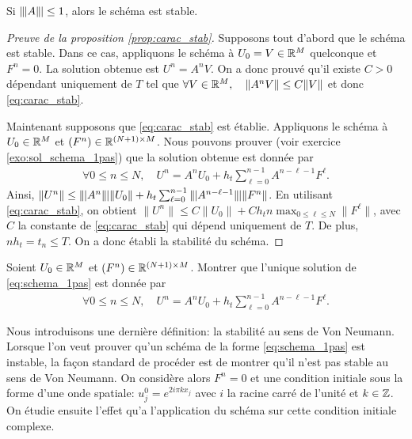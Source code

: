 \documentclass[12pt,a4paper,twoside]{article}
\begin{document}
\begin{corrolary}
  \label{corro:stability}
  Si $\|\!\;\!| A \|\!\;\!| \leq 1$, alors le sch\'ema est stable.
\end{corrolary}

\begin{proof}[Preuve de la proposition \ref{prop:carac_stab}]
  Supposons tout d'abord que le sch\'ema est stable.
  Dans ce cas, appliquons le sch\'ema \`a $U_0 = V \in \mathbb{R}^{M}$
  quelconque et $F^n = 0$. 
  La solution obtenue est $U^n = A^n V$.
  On a donc prouv\'e qu'il existe $C>0$ d\'ependant uniquement
  de $T$ tel que
  $\forall V \in \mathbb{R}^{M} , \quad \| A^n V \| \leq C \| V \|$
  et donc \eqref{eq:carac_stab}.

  Maintenant supposons que \eqref{eq:carac_stab} est \'etablie.
  Appliquons le sch\'ema \`a $U_0 \in \mathbb{R}^{M}$
  et $(F^n) \in \mathbb{R}^{(N+1) \times M}$.
  Nous pouvons prouver (voir exercice \ref{exo:sol_schema_1pas}) 
  que la solution obtenue est donn\'ee par
  \begin{align*}
    \forall 0 \leq n \leq N , \quad U^n = A^n U_0 + h_t \sum_{\ell = 0}^{n-1} A^{n-\ell-1} F^{\ell} .
  \end{align*}
  Ainsi, $\| U^n \| \leq \tn A^n \tn \| U_0 \| 
  + h_t \sum_{\ell = 0}^{n-1} \tn A^{n-\ell-1} \tn \| F^n \|$.
  En utilisant \eqref{eq:carac_stab}, on obtient
  $\| U^n \| \leq C \| U_0 \| + C h_t n \max_{0\leq \ell \leq N} \| F^{\ell} \|$,
  avec $C$ la constante de \eqref{eq:carac_stab} qui d\'epend
  uniquement de $T$.
  De plus, $n h_t = t_n \leq T$.
  On a donc \'etabli la stabilit\'e du sch\'ema.
\end{proof}


\begin{exercise}
  \label{exo:sol_schema_1pas}
  Soient $U_0 \in \mathbb{R}^{M}$ et $(F^n) \in \mathbb{R}^{(N+1) \times M}$.
  Montrer que l'unique solution de \eqref{eq:schema_1pas}
  est donn\'ee par
  \begin{align}
    \label{eq:sol_Un}
    \forall 0 \leq n \leq N , \quad  U^n = A^n U_0 + h_t \sum_{\ell = 0}^{n-1} A^{n-\ell-1} F^{\ell} .
  \end{align}
\end{exercise}


Nous introduisons une derni\`ere d\'efinition: la stabilit\'e
au sens de Von Neumann.
Lorsque l'on veut prouver qu'un sch\'ema de la forme \eqref{eq:schema_1pas}
est instable, la fa\c{c}on standard
de proc\'eder est de montrer qu'il n'est pas stable au sens de Von Neumann.
On consid\`ere alors $F^n = 0$ et une condition initiale sous la forme
d'une onde spatiale: $u_j^0 = e^{2 i \pi k x_j}$ avec $i$ la racine carr\'e de l'unit\'e
et $k \in \mathbb{Z}$.
On \'etudie ensuite l'effet qu'a l'application du sch\'ema sur cette condition initiale complexe.
\end{document}
